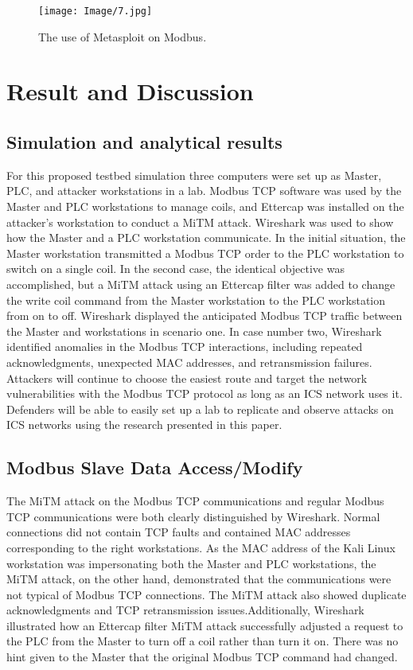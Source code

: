 \documentclass[letterpaper,10pt,conference]{IEEEtran}
\begin{document}
\begin{figure}[h!]
\centering
\texttt{[image: Image/7.jpg]}
\caption{The use of Metasploit on Modbus.}
\label{Fig. 7}
\end{figure}

\section{Result and Discussion}
\subsection{Simulation and analytical results}
For this proposed testbed simulation three computers were set up as Master, PLC, and attacker workstations in a lab. Modbus TCP software was used by the Master and PLC workstations to manage coils, and Ettercap was installed on the attacker's workstation to conduct a MiTM attack. Wireshark was used to show how the Master and a PLC workstation communicate. In the initial situation, the Master workstation transmitted a Modbus TCP order to the PLC workstation to switch on a single coil. In the second case, the identical objective was accomplished, but a MiTM attack using an Ettercap filter was added to change the write coil command from the Master workstation to the PLC workstation from on to off. Wireshark displayed the anticipated Modbus TCP traffic between the Master and workstations in scenario one. In case number two, Wireshark identified anomalies in the Modbus TCP interactions, including repeated acknowledgments, unexpected MAC addresses, and retransmission failures. Attackers will continue to choose the easiest route and target the network vulnerabilities with the Modbus TCP protocol as long as an ICS network uses it. Defenders will be able to easily set up a lab to replicate and observe attacks on ICS networks using the research presented in this paper. 

\subsection{Modbus Slave Data Access/Modify}
The MiTM attack on the Modbus TCP communications and regular Modbus TCP communications were both clearly distinguished by Wireshark. Normal connections did not contain TCP faults and contained MAC addresses corresponding to the right workstations. As the MAC address of the Kali Linux workstation was impersonating both the Master and PLC workstations, the MiTM attack, on the other hand, demonstrated that the communications were not typical of Modbus TCP connections. The MiTM attack also showed duplicate acknowledgments and TCP retransmission issues.Additionally, Wireshark illustrated how an Ettercap filter MiTM attack successfully adjusted a request to the PLC from the Master to turn off a coil rather than turn it on. There was no hint given to the Master that the original Modbus TCP command had changed.
\end{document}
